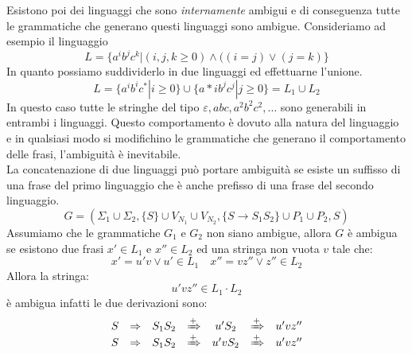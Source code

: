 Esistono poi dei linguaggi che sono \emph{internamente} ambigui e di conseguenza tutte le grammatiche che generano questi linguaggi sono ambigue. Consideriamo ad esempio il linguaggio 
$$L = \{a^ib^jc^k | (i,j,k\geq 0) \wedge ((i=j)\vee (j= k) \}$$
In quanto possiamo suddividerlo in due linguaggi ed effettuarne l'unione.
$$L = \{a^ib^ic^* |i \geq 0 \} \cup \{a*ib^jc^j |j \geq 0 \}= L_1 \cup L_2$$
In questo caso tutte le stringhe del tipo $ \varepsilon,abc,a^2b^2c^2,\dots $ sono generabili in entrambi i linguaggi. Questo comportamento è dovuto alla natura del linguaggio e in qualsiasi modo si modifichino le grammatiche che generano il comportamento delle frasi, l'ambiguità è inevitabile.\\
La concatenazione di due linguaggi può portare ambiguità se esiste un suffisso di una frase del primo linguaggio che è anche prefisso di una frase del secondo linguaggio.
	$$G= (\Sigma_1 \cup \Sigma_2, \{S\}\cup V_{N_1} \cup V_{N_2}, \{S \rightarrow S_1S_2 \} \cup P_1\cup P_2, S)$$
Assumiamo che le grammatiche $ G_1 $ e $ G_2 $ non siano ambigue, allora $ G $ è ambigua se esistono due frasi $ x' \in L_1 $ e $ x'' \in L_2 $ ed una stringa non vuota $ v $ tale che:
$$x' = u'v \vee u'\in L_1 \quad x'' = vz'' \vee z'' \in L_2$$
Allora la stringa:
$$u'vz''\in L_1\cdot L_2$$
è ambigua infatti le due derivazioni sono:
$$
\begin{array}{ccccccc}
S & \Rightarrow & S_1S_2 & \xRightarrow{+} & u'S_2 & \xRightarrow{+} & u'vz''\\
S & \Rightarrow & S_1S_2 & \xRightarrow{+} & u'vS_2 & \xRightarrow{+} & u'vz''
\end{array}
$$
